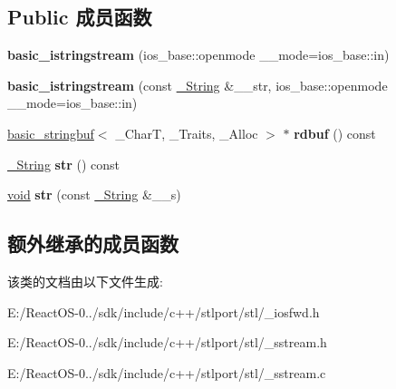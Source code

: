 \subsection*{Public 成员函数}
\begin{DoxyCompactItemize}
\item 
\mbox{\label{classbasic__istringstream_a3b559aa3e906ef9c3b4983882a63d64a}} 
{\bfseries basic\+\_\+istringstream} (ios\+\_\+base\+::openmode \+\_\+\+\_\+mode=ios\+\_\+base\+::in)
\item 
\mbox{\label{classbasic__istringstream_a86cd8108b010bc8574521815959fd0d5}} 
{\bfseries basic\+\_\+istringstream} (const \hyperlink{classbasic__string}{\+\_\+\+String} \&\+\_\+\+\_\+str, ios\+\_\+base\+::openmode \+\_\+\+\_\+mode=ios\+\_\+base\+::in)
\item 
\mbox{\label{classbasic__istringstream_afa1dc5e2a06a47b680760f95efe711d0}} 
\hyperlink{classbasic__stringbuf}{basic\+\_\+stringbuf}$<$ \+\_\+\+CharT, \+\_\+\+Traits, \+\_\+\+Alloc $>$ $\ast$ {\bfseries rdbuf} () const
\item 
\mbox{\label{classbasic__istringstream_a8172b40e5cd7c5a6ea3c6d3b9d214ff2}} 
\hyperlink{classbasic__string}{\+\_\+\+String} {\bfseries str} () const
\item 
\mbox{\label{classbasic__istringstream_ae8ca1823a03a3e087346f1f3533bbdbf}} 
\hyperlink{interfacevoid}{void} {\bfseries str} (const \hyperlink{classbasic__string}{\+\_\+\+String} \&\+\_\+\+\_\+s)
\end{DoxyCompactItemize}
\subsection*{额外继承的成员函数}


该类的文档由以下文件生成\+:\begin{DoxyCompactItemize}
\item 
E\+:/\+React\+O\+S-\/0../sdk/include/c++/stlport/stl/\+\_\+iosfwd.\+h\item 
E\+:/\+React\+O\+S-\/0../sdk/include/c++/stlport/stl/\+\_\+sstream.\+h\item 
E\+:/\+React\+O\+S-\/0../sdk/include/c++/stlport/stl/\+\_\+sstream.\+c\end{DoxyCompactItemize}
